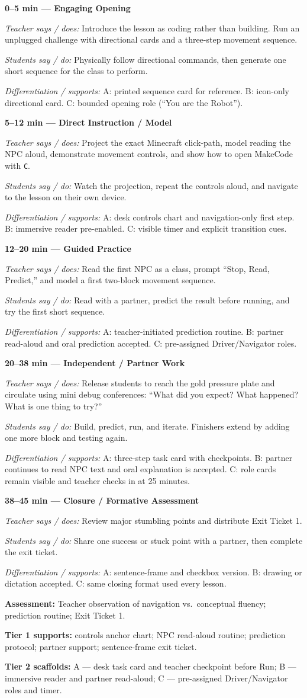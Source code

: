 \documentclass[12pt]{article}
\newcommand{\lessonphase}[5]{%
\noindent\textbf{\color{brickRed}#1 --- #2}\par
\textit{Teacher says / does:} #3\par
\textit{Students say / do:} #4\par
\textit{Differentiation / supports:} #5\par\medskip
}
\begin{document}
\newpage
\begin{designbox}
\lessonphase{0--5 min}{Engaging Opening}
{Introduce the lesson as coding rather than building. Run an unplugged challenge with directional cards and a three-step movement sequence.}
{Physically follow directional commands, then generate one short sequence for the class to perform.}
{A: printed sequence card for reference. B: icon-only directional card. C: bounded opening role (``You are the Robot'').}

\lessonphase{5--12 min}{Direct Instruction / Model}
{Project the exact Minecraft click-path, model reading the NPC aloud, demonstrate movement controls, and show how to open MakeCode with \texttt{C}.}
{Watch the projection, repeat the controls aloud, and navigate to the lesson on their own device.}
{A: desk controls chart and navigation-only first step. B: immersive reader pre-enabled. C: visible timer and explicit transition cues.}

\lessonphase{12--20 min}{Guided Practice}
{Read the first NPC as a class, prompt ``Stop, Read, Predict,'' and model a first two-block movement sequence.}
{Read with a partner, predict the result before running, and try the first short sequence.}
{A: teacher-initiated prediction routine. B: partner read-aloud and oral prediction accepted. C: pre-assigned Driver/Navigator roles.}

\lessonphase{20--38 min}{Independent / Partner Work}
{Release students to reach the gold pressure plate and circulate using mini debug conferences: ``What did you expect? What happened? What is one thing to try?''}
{Build, predict, run, and iterate. Finishers extend by adding one more block and testing again.}
{A: three-step task card with checkpoints. B: partner continues to read NPC text and oral explanation is accepted. C: role cards remain visible and teacher checks in at 25 minutes.}

\lessonphase{38--45 min}{Closure / Formative Assessment}
{Review major stumbling points and distribute Exit Ticket 1.}
{Share one success or stuck point with a partner, then complete the exit ticket.}
{A: sentence-frame and checkbox version. B: drawing or dictation accepted. C: same closing format used every lesson.}
\end{designbox}

\begin{assessbox}
\textbf{Assessment:} Teacher observation of navigation vs.\ conceptual fluency; prediction routine; Exit Ticket 1.\par
\textbf{Tier 1 supports:} controls anchor chart; NPC read-aloud routine; prediction protocol; partner support; sentence-frame exit ticket.\par
\textbf{Tier 2 scaffolds:} A --- desk task card and teacher checkpoint before Run; B --- immersive reader and partner read-aloud; C --- pre-assigned Driver/Navigator roles and timer.
\end{assessbox}
\end{document}
